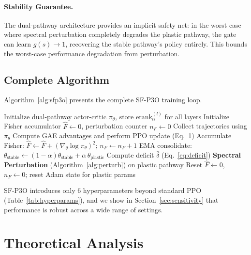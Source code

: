 \documentclass{article}
\newcommand{\erank}{\mathrm{erank}}
\begin{document}
\paragraph{Stability Guarantee.}
The dual-pathway architecture provides an implicit safety net: in the worst case where spectral perturbation completely degrades the plastic pathway, the gate can learn $g(s) \to 1$, recovering the stable pathway's policy entirely. This bounds the worst-case performance degradation from perturbation.


\subsection{Complete Algorithm}
\label{sec:full_algo}

Algorithm~\ref{alg:sfp3o} presents the complete SF-P3O training loop.

\begin{algorithm}[H]
\caption{SF-P3O: Spectral-Fisher Dual-Pathway PPO}
\label{alg:sfp3o}
\begin{algorithmic}[1]
\STATE Initialize dual-pathway actor-critic $\pi_\theta$, store $\erank_0^{(l)}$ for all layers
\STATE Initialize Fisher accumulator $\hat{F} \leftarrow 0$, perturbation counter $n_F \leftarrow 0$
    \STATE Collect trajectories using $\pi_\theta$
    \STATE Compute GAE advantages and perform PPO update (Eq.~1)
    \STATE Accumulate Fisher: $\hat{F} \leftarrow \hat{F} + (\nabla_\theta \log \pi_\theta)^2$; $n_F \leftarrow n_F + 1$
    \STATE EMA consolidate: $\theta_{\text{stable}} \leftarrow (1-\alpha)\theta_{\text{stable}} + \alpha\,\theta_{\text{plastic}}$
        \STATE Compute deficit $\bar{\delta}$ (Eq.~\ref{eq:deficit})
            \STATE \textbf{Spectral Perturbation} (Algorithm~\ref{alg:perturb}) on plastic pathway
            \STATE Reset $\hat{F} \leftarrow 0$, $n_F \leftarrow 0$; reset Adam state for plastic params
        \ENDIF
    \ENDIF
\ENDFOR
\end{algorithmic}
\end{algorithm}

SF-P3O introduces only 6 hyperparameters beyond standard PPO (Table~\ref{tab:hyperparams}), and we show in Section~\ref{sec:sensitivity} that performance is robust across a wide range of settings.


\section{Theoretical Analysis}
\label{sec:theory}
\end{document}
